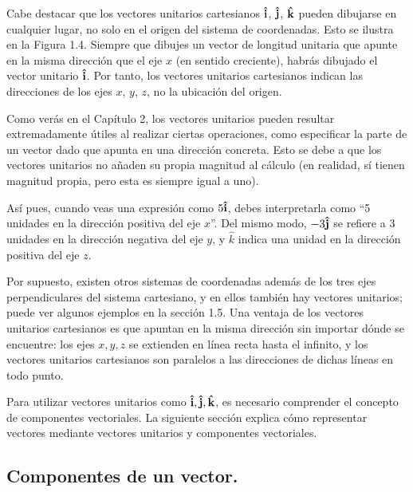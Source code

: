 \documentclass[hidelinks,12pt]{article}
\begin{document}
Cabe destacar que los vectores unitarios cartesianos $\vu{i}$, $\vu{j}$, $\vu{k}$ pueden dibujarse en cualquier lugar, no solo en el origen del sistema de coordenadas. Esto se ilustra en la Figura 1.4. Siempre que dibujes un vector de longitud unitaria que apunte en la misma dirección que el eje $x$ (en sentido creciente), habrás dibujado el vector unitario $\vu{i}$. Por tanto, los vectores unitarios cartesianos indican las direcciones de los ejes $x$, $y$, $z$, no la ubicación del origen.
\par
Como verás en el Capítulo 2, los vectores unitarios pueden resultar extremadamente útiles al realizar ciertas operaciones, como especificar la parte de un vector dado que apunta en una dirección concreta. Esto se debe a que los vectores unitarios no añaden su propia magnitud al cálculo (en realidad, sí tienen magnitud propia, pero esta es siempre igual a uno).
\par
Así pues, cuando veas una expresión como $5 \vu{i}$, debes interpretarla como \enquote{5 unidades en la dirección positiva del eje $x$}. Del mismo modo, $-3 \vu{j}$ se refiere a $3$ unidades en la dirección negativa del eje $y$, y $\hat{k}$ indica una unidad en la dirección positiva del eje $z$.
\par
Por supuesto, existen otros sistemas de coordenadas además de los tres ejes perpendiculares del sistema cartesiano, y en ellos también hay vectores unitarios; puede ver algunos ejemplos en la sección 1.5. Una ventaja de los vectores unitarios cartesianos es que apuntan en la misma dirección sin importar dónde se encuentre: los ejes $x, y, z$ se extienden en línea recta hasta el infinito, y los vectores unitarios cartesianos son paralelos a las direcciones de dichas líneas en todo punto.
\par
Para utilizar vectores unitarios como $\vu{i}, \vu{j}, \vu{k}$, es necesario comprender el concepto de componentes vectoriales. La siguiente sección explica cómo representar vectores mediante vectores unitarios y componentes vectoriales.

\subsection{Componentes de un vector.}
\end{document}
